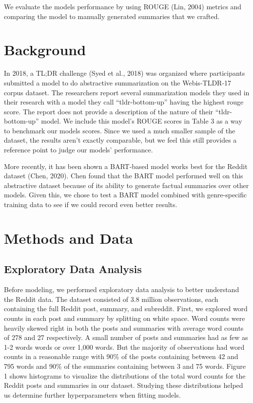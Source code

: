 \documentclass[11pt,a4paper, twocolumn]{article}
\begin{document}
We evaluate the models performance by using ROUGE (Lin, 2004) metrics and comparing the model to manually generated summaries that we crafted.



\section{Background}
\label{sec:length}

In 2018, a TL;DR challenge (Syed et al., 2018) was organized where participants submitted a model to do abstractive summarization on the Webis-TLDR-17 corpus dataset. The researchers report several summarization models they used in their research with a model they call “tldr-bottom-up” having the highest rouge score. The report does not provide a description of the nature of their “tldr-bottom-up” model. We include this model’s ROUGE scores in Table 3 as a way to benchmark our models scores. Since we used a much smaller sample of the dataset, the results aren’t exactly comparable, but we feel this still provides a reference point to judge our models’ performance.

More recently, it has been shown a BART-based model works best for the Reddit dataset (Chen, 2020). Chen found that the BART model performed well on this abstractive dataset because of its ability to generate factual summaries over other models. Given this, we chose to test a BART model combined with genre-specific training data to see if we could record even better results.

\section{Methods and Data}

\subsection{Exploratory Data Analysis}

Before modeling, we performed exploratory data analysis to better understand the Reddit data. 
The dataset consisted of 3.8 million observations, each containing the full Reddit post, summary, and subreddit. 
First, we explored word counts in each post and summary by splitting on white space. 
Word counts were heavily skewed right in both the posts and summaries with average word counts of 278 and 27 respectively. 
A small number of posts and summaries had as few as 1-2 words words or over 1,000 words. 
But the majority of observations had word counts in a reasonable range with 90\% of the posts containing between 42 and 795 words
and 90\% of the summaries containing between 3 and 75 words. 
Figure 1 shows histograms to visualize the distributions of the total word counts for the Reddit posts and summaries in our dataset. 
Studying these distributions helped us determine further hyperparameters when fitting models.
\end{document}
